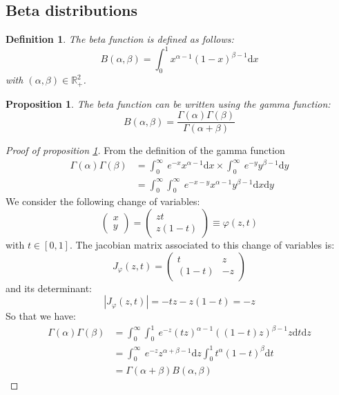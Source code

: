 \documentclass{amsart}
\theoremstyle{plain}
\newtheorem{proposition}{Proposition}[section]
\newtheorem{definition}{Definition}[section]
\theoremstyle{remark}
\numberwithin{equation}{section}
\begin{document}
\subsection{Beta distributions}\label{sec:BetaDistributions}

\begin{definition}\label{BetaFunction}
  The beta function is defined as follows:
  \[
    B(\alpha, \beta) = \int_0^1 x^{\alpha-1}(1-x)^{\beta-1}\mathrm dx
  \]
  with $(\alpha,\beta)\in\mathbb R_+^2$.
\end{definition}

\begin{proposition}\label{BetaAndGammaFunctions}
  The beta function can be written using the gamma function:
  \[
    B(\alpha,\beta) = \frac{\Gamma(\alpha)\Gamma(\beta)}{\Gamma(\alpha+\beta)}
  \]
\end{proposition}

\begin{proof}[Proof of proposition \ref{BetaAndGammaFunctions}]
  From the definition of the gamma function
  \[
    \begin{split}
      \Gamma(\alpha)\Gamma(\beta) &= \int_{0}^{\infty}\ e^{-x} x^{\alpha-1}\mathrm dx \times \int_{0}^{\infty}\ e^{-y} y^{\beta-1}\mathrm dy \\
      &= \int_{0}^{\infty}\int_{0}^{\infty}  \ e^{-x-y} x^{\alpha-1}y^{\beta-1}\mathrm dx\mathrm dy
    \end{split}
  \]
  We consider the following change of variables:
  \[
    \begin{pmatrix}
      x\\
      y
    \end{pmatrix}
    =
    \begin{pmatrix}
      z t \\
      z (1-t)
    \end{pmatrix}
    \equiv \varphi(z, t)
  \]
  with $t\in[0,1]$. The jacobian matrix associated to this change of variables is:
  \[
    J_{\varphi}(z,t) =
    \begin{pmatrix}
      t & z \\
      (1-t) & -z
    \end{pmatrix}
  \]
  and its determinant:
  \[
    \left|J_{\varphi}(z,t)\right| = -tz-z(1-t) = -z
  \]
  So that we have:
  \[
    \begin{split}
      \Gamma(\alpha)\Gamma(\beta) &= \int_{0}^{\infty}\int_{0}^{1}  \ e^{-z} (tz)^{\alpha-1}\left((1-t)z\right)^{\beta-1}z\mathrm dt\mathrm dz \\
      &= \int_{0}^{\infty} \ e^{-z} z^{\alpha+\beta-1}\mathrm dz \int_{0}^{1} t^{\alpha}(1-t)^{\beta}\mathrm dt\\
      &= \Gamma(\alpha+\beta)B(\alpha,\beta)
    \end{split}
  \]
  \end{proof}
\end{document}
